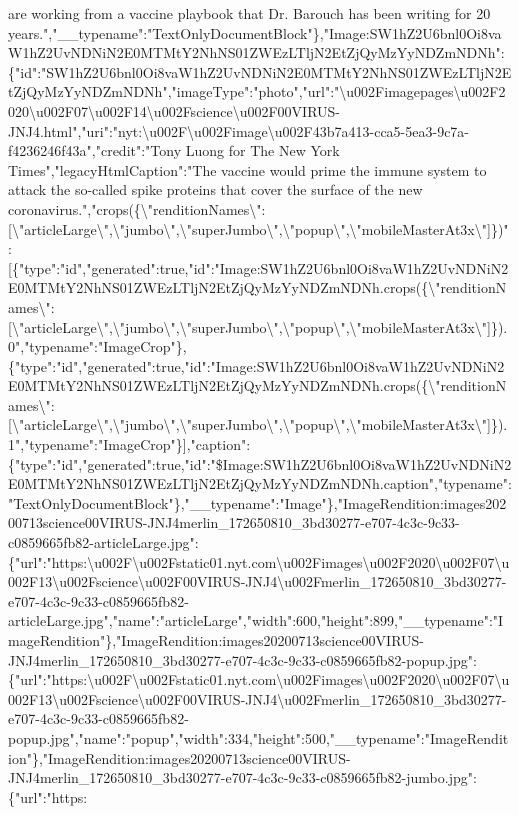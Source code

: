 are working from a vaccine playbook that Dr. Barouch has been writing
for 20
years.","\_\_typename":"TextOnlyDocumentBlock"\},"Image:SW1hZ2U6bnl0Oi8vaW1hZ2UvNDNiN2E0MTMtY2NhNS01ZWEzLTljN2EtZjQyMzYyNDZmNDNh":\{"id":"SW1hZ2U6bnl0Oi8vaW1hZ2UvNDNiN2E0MTMtY2NhNS01ZWEzLTljN2EtZjQyMzYyNDZmNDNh","imageType":"photo","url":"\textbackslash{}u002Fimagepages\textbackslash{}u002F2020\textbackslash{}u002F07\textbackslash{}u002F14\textbackslash{}u002Fscience\textbackslash{}u002F00VIRUS-JNJ4.html","uri":"nyt:\textbackslash{}u002F\textbackslash{}u002Fimage\textbackslash{}u002F43b7a413-cca5-5ea3-9c7a-f4236246f43a","credit":"Tony
Luong for The New York Times","legacyHtmlCaption":"The vaccine would
prime the immune system to attack the so-called spike proteins that
cover the surface of the new
coronavirus.","crops(\{\textbackslash{}"renditionNames\textbackslash{}":{[}\textbackslash{}"articleLarge\textbackslash{}",\textbackslash{}"jumbo\textbackslash{}",\textbackslash{}"superJumbo\textbackslash{}",\textbackslash{}"popup\textbackslash{}",\textbackslash{}"mobileMasterAt3x\textbackslash{}"{]}\})":{[}\{"type":"id","generated":true,"id":"Image:SW1hZ2U6bnl0Oi8vaW1hZ2UvNDNiN2E0MTMtY2NhNS01ZWEzLTljN2EtZjQyMzYyNDZmNDNh.crops(\{\textbackslash{}"renditionNames\textbackslash{}":{[}\textbackslash{}"articleLarge\textbackslash{}",\textbackslash{}"jumbo\textbackslash{}",\textbackslash{}"superJumbo\textbackslash{}",\textbackslash{}"popup\textbackslash{}",\textbackslash{}"mobileMasterAt3x\textbackslash{}"{]}\}).0","typename":"ImageCrop"\},\{"type":"id","generated":true,"id":"Image:SW1hZ2U6bnl0Oi8vaW1hZ2UvNDNiN2E0MTMtY2NhNS01ZWEzLTljN2EtZjQyMzYyNDZmNDNh.crops(\{\textbackslash{}"renditionNames\textbackslash{}":{[}\textbackslash{}"articleLarge\textbackslash{}",\textbackslash{}"jumbo\textbackslash{}",\textbackslash{}"superJumbo\textbackslash{}",\textbackslash{}"popup\textbackslash{}",\textbackslash{}"mobileMasterAt3x\textbackslash{}"{]}\}).1","typename":"ImageCrop"\}{]},"caption":\{"type":"id","generated":true,"id":"\$Image:SW1hZ2U6bnl0Oi8vaW1hZ2UvNDNiN2E0MTMtY2NhNS01ZWEzLTljN2EtZjQyMzYyNDZmNDNh.caption","typename":"TextOnlyDocumentBlock"\},"\_\_typename":"Image"\},"ImageRendition:images20200713science00VIRUS-JNJ4merlin\_172650810\_3bd30277-e707-4c3c-9c33-c0859665fb82-articleLarge.jpg":\{"url":"https:\textbackslash{}u002F\textbackslash{}u002Fstatic01.nyt.com\textbackslash{}u002Fimages\textbackslash{}u002F2020\textbackslash{}u002F07\textbackslash{}u002F13\textbackslash{}u002Fscience\textbackslash{}u002F00VIRUS-JNJ4\textbackslash{}u002Fmerlin\_172650810\_3bd30277-e707-4c3c-9c33-c0859665fb82-articleLarge.jpg","name":"articleLarge","width":600,"height":899,"\_\_typename":"ImageRendition"\},"ImageRendition:images20200713science00VIRUS-JNJ4merlin\_172650810\_3bd30277-e707-4c3c-9c33-c0859665fb82-popup.jpg":\{"url":"https:\textbackslash{}u002F\textbackslash{}u002Fstatic01.nyt.com\textbackslash{}u002Fimages\textbackslash{}u002F2020\textbackslash{}u002F07\textbackslash{}u002F13\textbackslash{}u002Fscience\textbackslash{}u002F00VIRUS-JNJ4\textbackslash{}u002Fmerlin\_172650810\_3bd30277-e707-4c3c-9c33-c0859665fb82-popup.jpg","name":"popup","width":334,"height":500,"\_\_typename":"ImageRendition"\},"ImageRendition:images20200713science00VIRUS-JNJ4merlin\_172650810\_3bd30277-e707-4c3c-9c33-c0859665fb82-jumbo.jpg":\{"url":"https:\tex